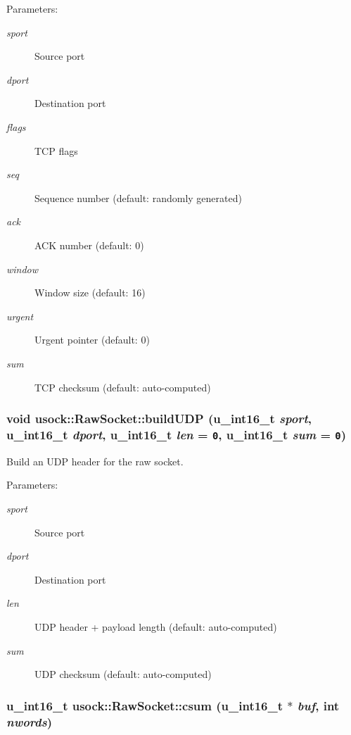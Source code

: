 \begin{Desc}
\item[Parameters:]
\begin{description}
\item[{\em sport}]Source port \item[{\em dport}]Destination port \item[{\em flags}]TCP flags \item[{\em seq}]Sequence number (default: randomly generated) \item[{\em ack}]ACK number (default: 0) \item[{\em window}]Window size (default: 16) \item[{\em urgent}]Urgent pointer (default: 0) \item[{\em sum}]TCP checksum (default: auto-computed) \end{description}
\end{Desc}
\hypertarget{classusock_1_1RawSocket_20dc8f4e7c0f5d499517b6410c5dca52}{
\subsubsection[{buildUDP}]{\setlength{\rightskip}{0pt plus 5cm}void usock::RawSocket::buildUDP (u\_\-int16\_\-t {\em sport}, \/  u\_\-int16\_\-t {\em dport}, \/  u\_\-int16\_\-t {\em len} = {\tt 0}, \/  u\_\-int16\_\-t {\em sum} = {\tt 0})}}
\label{classusock_1_1RawSocket_20dc8f4e7c0f5d499517b6410c5dca52}


Build an UDP header for the raw socket. 

\begin{Desc}
\item[Parameters:]
\begin{description}
\item[{\em sport}]Source port \item[{\em dport}]Destination port \item[{\em len}]UDP header + payload length (default: auto-computed) \item[{\em sum}]UDP checksum (default: auto-computed) \end{description}
\end{Desc}
\hypertarget{classusock_1_1RawSocket_11c89cceced7302fe25163fbc74a6b83}{
\subsubsection[{csum}]{\setlength{\rightskip}{0pt plus 5cm}u\_\-int16\_\-t usock::RawSocket::csum (u\_\-int16\_\-t $\ast$ {\em buf}, \/  int {\em nwords})}}
\label{classusock_1_1RawSocket_11c89cceced7302fe25163fbc74a6b83}


